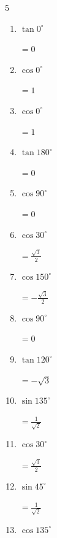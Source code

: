 \begin{multicols}{5}
\begin{enumerate}
        $\displaystyle =0$

  \item $\displaystyle \tan{0^\circ}$

        $\displaystyle =0$

  \item $\displaystyle \cos{0^\circ}$

        $\displaystyle =1$

  \item $\displaystyle \cos{0^\circ}$

        $\displaystyle =1$

  \item $\displaystyle \tan{180^\circ}$

        $\displaystyle =0$

  \item $\displaystyle \cos{90^\circ}$

        $\displaystyle =0$

  \item $\displaystyle \cos{30^\circ}$

        $\displaystyle =\frac{\sqrt{3}}{2}$

  \item $\displaystyle \cos{150^\circ}$

        $\displaystyle =-\frac{\sqrt{3}}{2}$

  \item $\displaystyle \cos{90^\circ}$

        $\displaystyle =0$

  \item $\displaystyle \tan{120^\circ}$

        $\displaystyle =-\sqrt{3}$

  \item $\displaystyle \sin{135^\circ}$

        $\displaystyle =\frac{1}{\sqrt{2}}$

  \item $\displaystyle \cos{30^\circ}$

        $\displaystyle =\frac{\sqrt{3}}{2}$

\columnbreak %

\resetques

  \item $\displaystyle \sin{45^\circ}$

        $\displaystyle =\frac{1}{\sqrt{2}}$

  \item $\displaystyle \cos{135^\circ}$


\end{enumerate}
\end{multicols}
